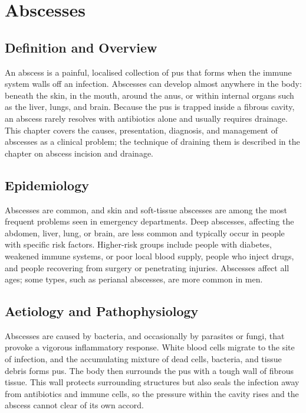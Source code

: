 \chapter{Abscesses}

\section*{Definition and Overview}
An abscess is a painful, localised collection of pus that forms when the immune system walls off an infection. Abscesses can develop almost anywhere in the body: beneath the skin, in the mouth, around the anus, or within internal organs such as the liver, lungs, and brain. Because the pus is trapped inside a fibrous cavity, an abscess rarely resolves with antibiotics alone and usually requires drainage. This chapter covers the causes, presentation, diagnosis, and management of abscesses as a clinical problem; the technique of draining them is described in the chapter on abscess incision and drainage.

\section*{Epidemiology}
Abscesses are common, and skin and soft-tissue abscesses are among the most frequent problems seen in emergency departments. Deep abscesses, affecting the abdomen, liver, lung, or brain, are less common and typically occur in people with specific risk factors. Higher-risk groups include people with diabetes, weakened immune systems, or poor local blood supply, people who inject drugs, and people recovering from surgery or penetrating injuries. Abscesses affect all ages; some types, such as perianal abscesses, are more common in men.

\section*{Aetiology and Pathophysiology}
Abscesses are caused by bacteria, and occasionally by parasites or fungi, that provoke a vigorous inflammatory response. White blood cells migrate to the site of infection, and the accumulating mixture of dead cells, bacteria, and tissue debris forms pus. The body then surrounds the pus with a tough wall of fibrous tissue. This wall protects surrounding structures but also seals the infection away from antibiotics and immune cells, so the pressure within the cavity rises and the abscess cannot clear of its own accord.

